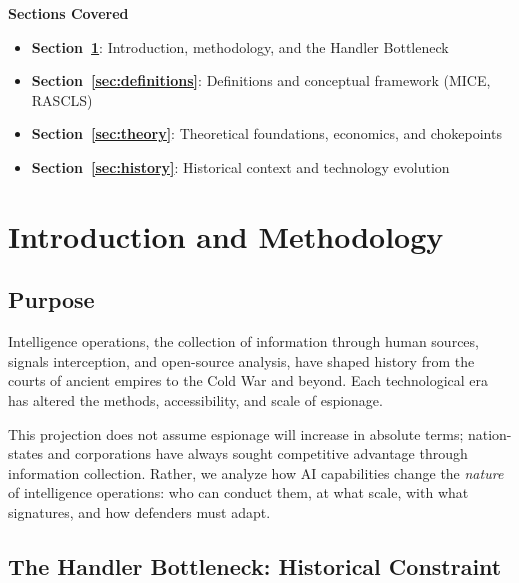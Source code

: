 \documentclass[11pt,letterpaper]{article}
\begin{document}
\vspace{0.8cm}
\begin{center}
\begin{minipage}{0.9\textwidth}
\begin{tcolorbox}[enhanced, colback=white, colframe=steelblue!40, boxrule=1pt, arc=4pt,
  left=15pt, right=15pt, top=12pt, bottom=12pt]
\textcolor{shadowdark}{\textbf{Sections Covered}}
\vspace{0.4em}
\begin{itemize}[nosep]
  \item \textbf{Section~\ref{sec:intro}}: Introduction, methodology, and the Handler Bottleneck
  \item \textbf{Section~\ref{sec:definitions}}: Definitions and conceptual framework (MICE, RASCLS)
  \item \textbf{Section~\ref{sec:theory}}: Theoretical foundations, economics, and chokepoints
  \item \textbf{Section~\ref{sec:history}}: Historical context and technology evolution
\end{itemize}
\end{tcolorbox}
\end{minipage}
\end{center}


\section{Introduction and Methodology}\label{sec:intro}

\subsection{Purpose}

Intelligence operations, the collection of information through human sources, signals interception, and open-source analysis, have shaped history from the courts of ancient empires to the Cold War and beyond. Each technological era has altered the methods, accessibility, and scale of espionage.

This projection does not assume espionage will increase in absolute terms; nation-states and corporations have always sought competitive advantage through information collection. Rather, we analyze how AI capabilities change the \textit{nature} of intelligence operations: who can conduct them, at what scale, with what signatures, and how defenders must adapt.

\subsection{The Handler Bottleneck: Historical Constraint}
\end{document}
